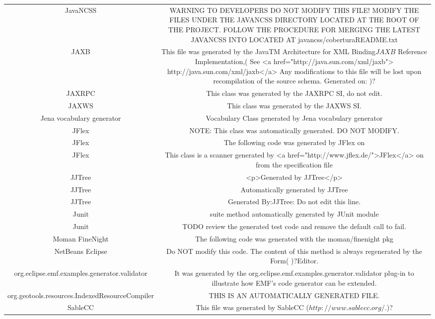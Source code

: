 \begin{table}
\begin{tabularx}{\textwidth}{c|C}
		JavaNCSS & WARNING TO \project DEVELOPERS DO NOT MODIFY THIS FILE! MODIFY THE FILES UNDER THE JAVANCSS DIRECTORY LOCATED AT THE ROOT OF THE \project PROJECT. FOLLOW THE PROCEDURE FOR MERGING THE LATEST JAVANCSS INTO \project LOCATED AT javancss/coberturaREADME.txt \\
		JAXB & This file was generated by the JavaTM Architecture for XML Binding\(JAXB\) Reference Implementation,( \version See <a href="http://java.sun.com/xml/jaxb"> http://java.sun.com/xml/jaxb</a> Any modifications to this file will be lost upon recompilation of the source schema. Generated on: \timestamp)? \\
		JAXRPC & This class was generated by the JAXRPC SI, do not edit. \\
		JAXWS & This class was generated by the JAXWS SI. \\
		Jena vocabulary generator & Vocabulary Class generated by Jena vocabulary generator \\
		JFlex & NOTE: This class was automatically generated. DO NOT MODIFY. \\
		JFlex & The following code was generated by JFlex \version on \timestamp \\
		JFlex & This class is a scanner generated by <a href="http://www.jflex.de/">JFlex</a> \version on \timestamp from the specification file  \\
		JJTree & <p>Generated by JJTree</p> \\
		JJTree & Automatically generated by JJTree \\
		JJTree & Generated By:JJTree: Do not edit this line. \\
		Junit & suite method automatically generated by JUnit module \\
		Junit & TODO review the generated test code and remove the default call to fail. \\
		Moman FineNight & The following code was generated with the moman/finenight pkg \\
		NetBeans Eclipse & Do NOT modify this code. The content of this method is always regenerated by the Form( )?Editor. \\
		org.eclipse.emf.examples.generator.validator & It was generated by the org.eclipse.emf.examples.generator.validator plug-in to illustrate how EMF's code generator can be extended. \\
		org.geotools.resources.IndexedResourceCompiler & THIS IS AN AUTOMATICALLY GENERATED FILE. \\
		SableCC & This file was generated by SableCC (\(http://www.sablecc.org/\).)? \\

\end{tabularx}
\end{table}
